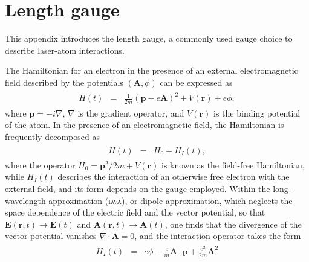 \chapter{Length gauge}
\label{app:L_gauge}

This appendix introduces the length gauge, a commonly used gauge
choice to describe laser-atom interactions.

The Hamiltonian for an electron in the presence of an external
electromagnetic field described by the potentials $(\mathbf{A},\phi)$
can be expressed as
%
\begin{eqnarray}
  \label{eq:H_lgauge}
  \begin{split}
    H(t) & = & \frac{1}{2m}(\mathbf{p} - e\mathbf{A})^{2}
    + V(\mathbf{r}) + e\phi,
  \end{split}
\end{eqnarray}
%
where $\mathbf{p} = -i\nabla$, $\nabla$ is the gradient operator, and
$V(\mathbf{r})$ is the binding potential of the atom. In the presence
of an electromagnetic field, the Hamiltonian is frequently decomposed
as
%
\begin{eqnarray}
  \label{eq:H_decomposed}
  \begin{split}
    H(t) & = & H_{0} + H_{I}(t),
  \end{split}
\end{eqnarray}
%
where the operator $H_{0} = \mathbf{p}^{2}/2m + V(\mathbf{r})$ is
known as the field-free Hamiltonian, while $H_{I}(t)$ describes the
interaction of an otherwise free electron with the external field, and
its form depends on the gauge employed. Within the long-wavelength
approximation (\textsc{lwa}), or dipole approximation, which neglects
the space dependence of the electric field and the vector potential,
so that $\mathbf{E}(\mathbf{r}, t) \to \mathbf{E}(t)$ and
$\mathbf{A}(\mathbf{r}, t) \to \mathbf{A}(t)$, one finds that the
divergence of the vector potential vanishes $\nabla\cdot\mathbf{A} =
0$, and the interaction operator takes the form
%
\begin{eqnarray}
  \label{eq:H_dipole}
  \begin{split}
    H_{I}(t) & = & e\phi -
    \frac{e}{m}\mathbf{A}\cdot\mathbf{p} + \frac{e^{2}}{2m}\mathbf{A}^{2}
  \end{split}
\end{eqnarray}
%

